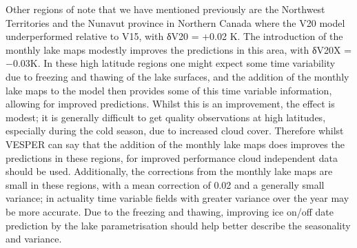 \documentclass[hess, manuscript]{copernicus}
\begin{document}
Other regions of note that we have mentioned previously are the Northwest Territories and the Nunavut province in Northern Canada where the V20 model underperformed relative to V15, with δV20 = +0.02 K. The introduction of the monthly lake maps modestly improves the predictions in this area, with δV20X = −0.03K. In these high latitude regions one might expect some time variability due to freezing and thawing of the lake surfaces, and the addition of the monthly lake maps to the model then provides some of this time variable information, allowing for improved predictions. Whilst this is an improvement, the effect is modest; it is generally difficult to get quality observations at high latitudes, especially during the cold season, due to increased cloud cover. Therefore whilst VESPER can say that the addition of the monthly lake maps does improves the predictions in these regions, for improved performance cloud independent data should be used. Additionally, the corrections from the monthly lake maps are small in these regions, with a mean correction of 0.02 and a generally small variance; in actuality time variable fields with greater variance over the year may be more accurate. Due to the freezing and thawing, improving ice on/off date prediction by the lake parametrisation should help better describe the seasonality and variance.
\end{document}
